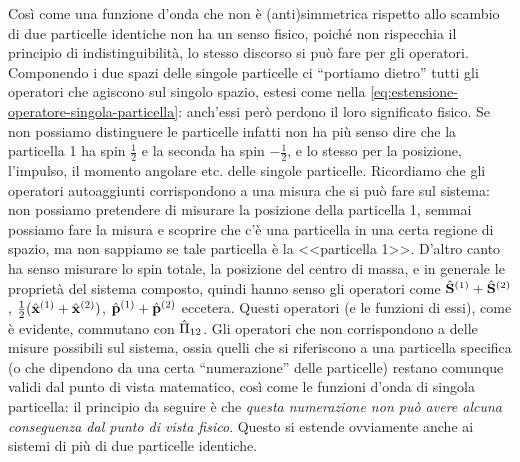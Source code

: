 \begin{osservazione} \label{o:osservabili-scambio-particelle}
    Cos\`i come una funzione d'onda che non è (anti)simmetrica rispetto allo scambio di due particelle identiche non ha un senso fisico, poich\'e non rispecchia il principio di indistinguibilità, lo stesso discorso si può fare per gli operatori.
    Componendo i due spazi delle singole particelle ci ``portiamo dietro'' tutti gli operatori che agiscono sul singolo spazio, estesi come nella \eqref{eq:estensione-operatore-singola-particella}: anch'essi però perdono il loro significato fisico.
    Se non possiamo distinguere le particelle infatti non ha più senso dire che la particella 1 ha spin $\frac12$ e la seconda ha spin $-\frac12$, e lo stesso per la posizione, l'impulso, il momento angolare etc. delle singole particelle.
    Ricordiamo che gli operatori autoaggiunti corrispondono a una misura che si può fare sul sistema: non possiamo pretendere di misurare la posizione della particella 1, semmai possiamo fare la misura e scoprire che c'è una particella in una certa regione di spazio, ma non sappiamo se tale particella è la <<particella 1>>.
    D'altro canto ha senso misurare lo spin totale, la posizione del centro di massa, e in generale le proprietà del sistema composto, quindi hanno senso gli operatori come $\hat{\mathbf{S}}^{(1)}+\hat{\mathbf{S}}^{(2)}$, $\frac12(\hat{\mathbf{x}}^{(1)}+\hat{\mathbf{x}}^{(2)})$, $\hat{\mathbf{p}}^{(1)}+\hat{\mathbf{p}}^{(2)}$ eccetera.
    Questi operatori (e le funzioni di essi), come è evidente, commutano con $\hat{\Pi}_{12}$.
    Gli operatori che non corrispondono a delle misure possibili sul sistema, ossia quelli che si riferiscono a una particella specifica (o che dipendono da una certa ``numerazione'' delle particelle) restano comunque validi dal punto di vista matematico, cos\`i come le funzioni d'onda di singola particella: il principio da seguire è che \emph{questa numerazione non può avere alcuna conseguenza dal punto di vista fisico}.
    Questo si estende ovviamente anche ai sistemi di più di due particelle identiche.
\end{osservazione}
